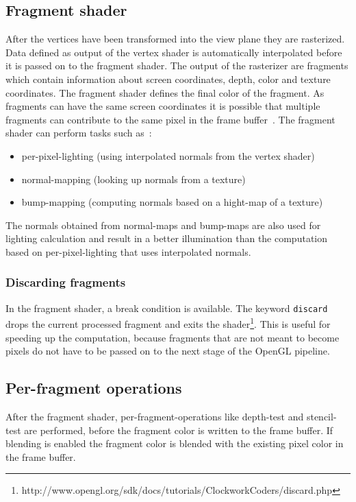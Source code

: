 \subsection{Fragment shader}	
After the vertices have been transformed into the view plane they are rasterized. Data defined as output of the vertex shader is automatically interpolated before it is passed on to the fragment shader. The output of the rasterizer are fragments which contain information about screen coordinates, depth, color and texture coordinates. The fragment shader defines the final color of the fragment. As fragments can have the same screen coordinates it is possible that multiple fragments can contribute to the same pixel in the frame buffer~\cite{book:computerGraphicsHill}. The fragment shader can perform tasks such as~\cite{book:computerGraphicsHill}: %
\begin{itemize}%
	\item per-pixel-lighting (using interpolated normals from the vertex shader)
	\item normal-mapping (looking up normals from a texture)
	\item bump-mapping (computing normals based on a hight-map of a texture)
\end{itemize}

The normals obtained from normal-maps and bump-maps are also used for lighting calculation and result in a better illumination than the computation based on per-pixel-lighting that uses interpolated normals.

\subsubsection{Discarding fragments}
In the fragment shader, a break condition is available. The keyword \texttt{discard} drops the current processed fragment and exits the shader\footnote{http://www.opengl.org/sdk/docs/tutorials/ClockworkCoders/discard.php}. This is useful for speeding up the computation, because fragments that are not meant to become pixels do not have to be passed on to the next stage of the OpenGL pipeline.

\subsection{Per-fragment operations}
After the fragment shader, per-fragment-operations like depth-test and stencil-test are performed, before the fragment color is written to the frame buffer. If blending is enabled the fragment color is blended with the existing pixel color in the frame buffer.

